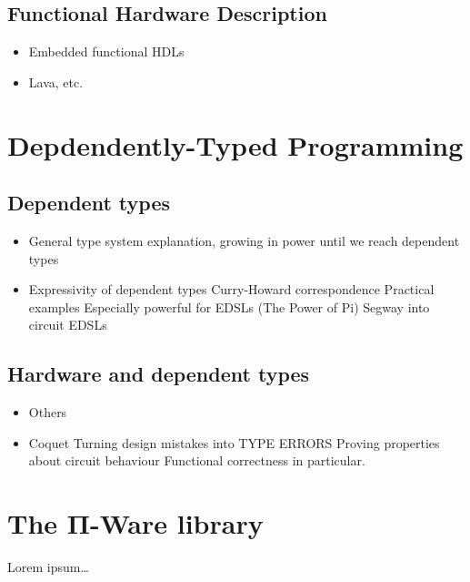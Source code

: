 \documentclass[a4paper]{article}
\begin{document}
        \subsection{Functional Hardware Description}
        \label{subsec:functional-hardware}
            \begin{itemize}
                \item Embedded functional HDLs
                \item Lava, etc.
            \end{itemize}


    \section{Depdendently-Typed Programming}
    \label{sec:dtp}

        \subsection{Dependent types}
        \label{subsec:dependent-types}
            \begin{itemize}
                \item General type system explanation, growing in power until we reach dependent types
                \item Expressivity of dependent types
                    \subitem Curry-Howard correspondence
                    \subitem Practical examples
                        \subsubitem Especially powerful for EDSLs (The Power of Pi)
                        \subsubitem Segway into circuit EDSLs
            \end{itemize}

        \subsection{Hardware and dependent types}
        \label{subsec:hardware-dtp}
            \begin{itemize}
                \item Others
                \item Coquet
                    \subitem Turning design mistakes into TYPE ERRORS
                    \subitem Proving properties about circuit behaviour
                    \subsubitem Functional correctness in particular.
            \end{itemize}


    \section{The Π-Ware library}
    \label{sec:piware}
        Lorem ipsum\ldots
\end{document}
